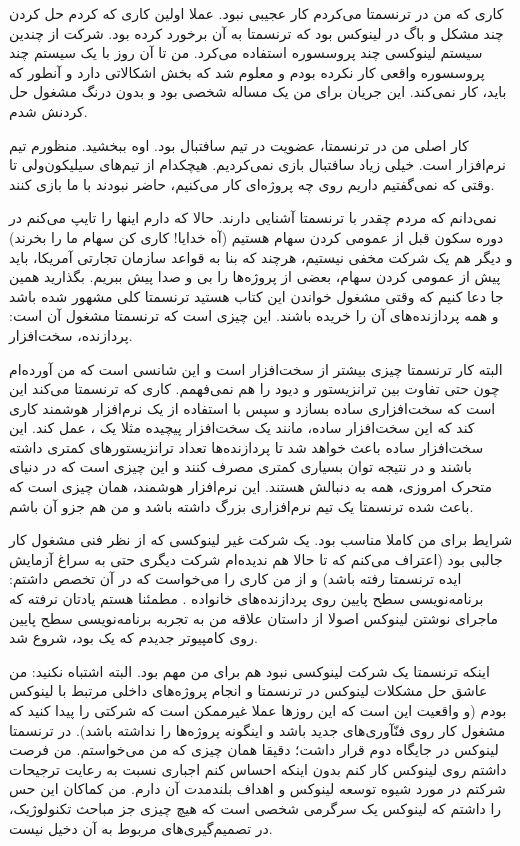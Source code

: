 کاری که من در ترنسمتا می‌کردم کار عجیبی نبود. عملا اولین کاری که کردم
حل کردن چند مشکل و باگ در لینوکس بود که ترنسمتا به آن برخورد کرده
بود. شرکت از چندین سیستم لینوکسی چند پروسسوره استفاده می‌کرد. من تا آن
روز با یک سیستم چند پروسسوره واقعی کار نکرده بودم و معلوم شد که بخش
 اشکالاتی دارد و آنطور که
باید، کار نمی‌کند. این جریان برای من یک مساله شخصی بود و بدون درنگ
مشغول حل کردنش شدم.

کار اصلی من در ترنسمتا، عضویت در تیم سافتبال بود. اوه ببخشید. منظورم
تیم نرم‌افزار است. خیلی زیاد سافتبال بازی نمی‌کردیم. هیچکدام از تیم‌های سیلیکون‌ولی
تا وقتی که نمی‌گفتیم داریم روی چه پروژه‌ای کار می‌کنیم، حاضر نبودند با ما
بازی کنند.

نمی‌دانم که مردم چقدر با ترنسمتا آشنایی دارند. حالا که دارم اینها را
تایپ می‌کنم در دوره سکون قبل از عمومی کردن سهام هستیم (آه خدایا! کاری
کن سهام ما را بخرند) و دیگر هم یک شرکت مخفی نیستیم، هرچند که بنا به
قواعد سازمان تجارتی آمریکا، باید پیش از عمومی کردن سهام، بعضی از
پروژه‌ها را بی و صدا پیش ببریم. بگذارید همین جا دعا کنیم که وقتی مشغول
خواندن این کتاب هستید ترنسمتا کلی مشهور شده باشد و همه پردازنده‌های آن
را خریده باشند. این چیزی است که ترنسمتا مشغول آن است: پردازنده،
سخت‌افزار.

البته کار ترنسمتا چیزی بیشتر از سخت‌افزار است و این شانسی است که من
آورده‌ام چون حتی تفاوت بین ترانزیستور و دیود را هم نمی‌فهمم. کاری که
ترنسمتا می‌کند این است که سخت‌افزاری ساده بسازد و سپس با استفاده از یک
نرم‌افزار هوشمند کاری کند که این سخت‌افزار ساده، مانند یک سخت‌افزار
پیچیده مثلا یک ، عمل کند. این سخت‌افزار ساده باعث خواهد شد تا
پردازنده‌ها تعداد ترانزیستورهای کمتری داشته باشند و در نتیجه توان
بسیاری کمتری مصرف کنند و این چیزی است که در دنیای متحرک امروزی، همه به
دنبالش هستند. این نرم‌افزار هوشمند، همان چیزی است که باعث شده ترنسمتا
یک تیم نرم‌افزاری بزرگ داشته باشد و من هم جزو آن باشم.

شرایط برای من کاملا مناسب بود. یک شرکت غیر لینوکسی که از نظر فنی مشغول
کار جالبی بود (اعتراف می‌کنم که تا حالا هم ندیده‌ام شرکت دیگری حتی به
سراغ آزمایش ایده ترنسمتا رفته باشد) و از من کاری را می‌خواست که در آن
تخصص داشتم: برنامه‌نویسی سطح پایین روی پردازنده‌های خانواده
. مطمئنا هستم یادتان نرفته که ماجرای نوشتن لینوکس اصولا از
داستان علاقه من به تجربه برنامه‌نویسی سطح پایین روی کامپیوتر جدیدم که
یک  بود، شروع شد.

اینکه ترنسمتا یک شرکت لینوکسی نبود هم برای من مهم بود. البته اشتباه
نکنید: من عاشق حل مشکلات لینوکس در ترنسمتا و انجام پروژه‌های داخلی
مرتبط با لینوکس بودم (و واقعیت این است که این روزها عملا غیرممکن است
که شرکتی را پیدا کنید که مشغول کار روی فنّآوری‌های جدید باشد و اینگونه
پروژه‌ها را نداشته باشد). در ترنسمتا لینوکس در جایگاه دوم قرار داشت؛
دقیقا همان چیزی که من می‌خواستم. من فرصت داشتم روی لینوکس کار کنم بدون
اینکه احساس کنم اجباری نسبت به رعایت ترجیحات شرکتم در مورد شیوه توسعه
لینوکس و اهداف بلندمدت آن دارم. من کماکان این حس را داشتم که لینوکس یک
سرگرمی شخصی است که هیچ چیزی جز مباحث تکنولوژیک، در تصمیم‌گیری‌های مربوط
به آن دخیل نیست.

